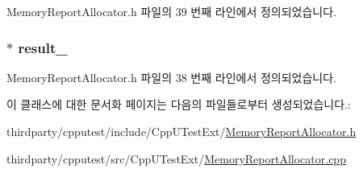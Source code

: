 Memory\+Report\+Allocator.\+h 파일의 39 번째 라인에서 정의되었습니다.

\subsubsection[{\texorpdfstring{result\+\_\+}{result_}}]{$\ast$ result\+\_\+\hspace{0.3cm}{\ttfamily [protected]}}\hypertarget{class_memory_report_allocator_acf81b99797e96c7d602ffc4c3cb012b0}{}\label{class_memory_report_allocator_acf81b99797e96c7d602ffc4c3cb012b0}


Memory\+Report\+Allocator.\+h 파일의 38 번째 라인에서 정의되었습니다.



이 클래스에 대한 문서화 페이지는 다음의 파일들로부터 생성되었습니다.\+:\begin{DoxyCompactItemize}
\item 
thirdparty/cpputest/include/\+Cpp\+U\+Test\+Ext/\hyperlink{_memory_report_allocator_8h}{Memory\+Report\+Allocator.\+h}\item 
thirdparty/cpputest/src/\+Cpp\+U\+Test\+Ext/\hyperlink{_memory_report_allocator_8cpp}{Memory\+Report\+Allocator.\+cpp}\end{DoxyCompactItemize}
